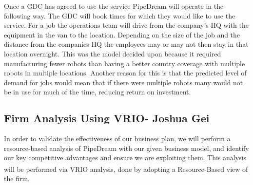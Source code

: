 \documentclass[11pt]{article}		%
\newcommand{\supercite}[1]{\textsuperscript{\cite{#1}}}		%
\begin{document}
	       Once a GDC has agreed to use the service PipeDream will operate in the following way.
	       The GDC will book times for which they would like to use the service. For a job the operations team will drive from the company’s HQ with the equipment in the van to the location. Depending on the size of the job and the distance from the companies HQ the employees may or may not then stay in that location overnight. This was the model  decided upon because it required manufacturing fewer robots than having a better country coverage with multiple robots in multiple locations. Another reason for this is that the predicted level of demand for jobs would mean that if there were multiple robots many would not be in use for much of the time, reducing return on investment.%
    
    	\subsection[Firm Analysis Using VRIO]{Firm Analysis Using VRIO- Joshua Gei} \label{vrioAnalysisSection}
    	
	In order to validate the effectiveness of our business plan, we will perform a resource-based analysis of PipeDream with our given business model, and identify our key competitive advantages and ensure we are exploiting them. This analysis will be performed via VRIO analysis\supercite{VRIO}, done by adopting a Resource-Based view of the firm. 
	
	
\end{document}

